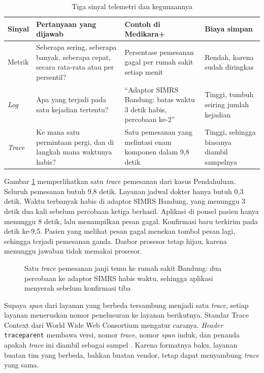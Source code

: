 \begin{table}[!htb]
  \centering
  \caption{Tiga sinyal telemetri dan kegunaannya}
  \label{tab:ch11-tiga-sinyal}
  \footnotesize
  \begin{tabularx}{\textwidth}{>{\raggedright\arraybackslash}p{1.4cm} >{\raggedright\arraybackslash}X >{\raggedright\arraybackslash}X >{\raggedright\arraybackslash}p{2.3cm}}
    \hline
    \textbf{Sinyal} & \textbf{Pertanyaan yang dijawab} & \textbf{Contoh di Medikara+} & \textbf{Biaya simpan} \\ \hline
    Metrik & Seberapa sering, seberapa banyak, seberapa cepat, secara rata-rata atau per
      persentil? & Persentase pemesanan gagal per rumah sakit setiap menit & Rendah, karena
      sudah diringkas \\ \hline
    \textit{Log} & Apa yang terjadi pada satu kejadian tertentu? & ``Adaptor SIMRS Bandung:
      batas waktu 3 detik habis, percobaan ke-2'' & Tinggi, tumbuh seiring jumlah kejadian \\ \hline
    \textit{Trace} & Ke mana satu permintaan pergi, dan di langkah mana waktunya habis? & Satu
      pemesanan yang melintasi enam komponen dalam 9,8 detik & Tinggi, sehingga biasanya
      diambil sampelnya \\ \hline
  \end{tabularx}
\end{table}

Gambar \ref{fig:ch11-trace-janji-temu} memperlihatkan satu \textit{trace} pemesanan dari kasus
Pendahuluan. Seluruh pemesanan butuh 9,8 detik. Layanan jadwal dokter hanya butuh 0,3 detik. Waktu
terbanyak habis di adaptor SIMRS Bandung, yang menunggu 3 detik dua kali sebelum percobaan ketiga
berhasil. Aplikasi di ponsel pasien hanya menunggu 8 detik, lalu menampilkan pesan gagal.
Konfirmasi baru terkirim pada detik ke-9,5. Pasien yang melihat pesan gagal menekan tombol pesan
lagi, sehingga terjadi pemesanan ganda. Dasbor prosesor tetap hijau, karena menunggu jawaban tidak
memakai prosesor.

\begin{figure}[!htb]
  \centering
  
  \caption{Satu \textit{trace} pemesanan janji temu ke rumah sakit Bandung: dua percobaan ke
           adaptor SIMRS habis waktu, sehingga aplikasi menyerah sebelum konfirmasi tiba}
  \label{fig:ch11-trace-janji-temu}
\end{figure}

Supaya \textit{span} dari layanan yang berbeda tersambung menjadi satu \textit{trace}, setiap
layanan meneruskan nomor penelusuran ke layanan berikutnya. Standar Trace Context dari World Wide
Web Consortium mengatur caranya. \textit{Header} \texttt{traceparent} membawa versi, nomor
\textit{trace}, nomor \textit{span} induk, dan penanda apakah \textit{trace} ini diambil sebagai
sampel \cite{c11-w3c-tracecontext}. Karena formatnya baku, layanan buatan tim yang berbeda,
bahkan buatan vendor, tetap dapat menyambung \textit{trace} yang sama.

